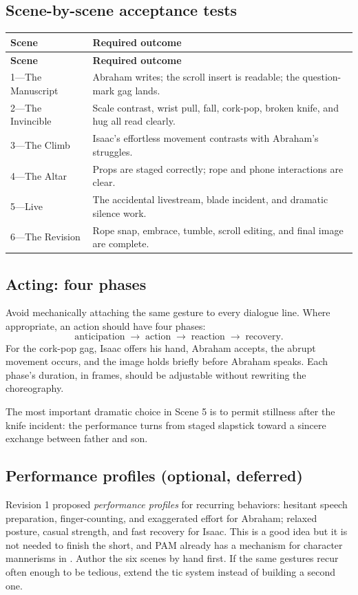 \documentclass[12pt,letterpaper]{article}
\newcommand{\file}[1]{\texttt{\detokenize{#1}}}
\begin{document}
\subsection{Scene-by-scene acceptance tests}
\begin{longtable}{@{}p{}p{}@{}}
\toprule
\textbf{Scene} & \textbf{Required outcome}\\
\midrule
\endfirsthead
\toprule
\textbf{Scene} & \textbf{Required outcome}\\
\midrule
\endhead
1---The Manuscript & Abraham writes; the scroll insert is readable; the question-mark gag lands.\\
2---The Invincible & Scale contrast, wrist pull, fall, cork-pop, broken knife, and hug all read clearly.\\
3---The Climb & Isaac's effortless movement contrasts with Abraham's struggles.\\
4---The Altar & Props are staged correctly; rope and phone interactions are clear.\\
5---Live & The accidental livestream, blade incident, and dramatic silence work.\\
6---The Revision & Rope snap, embrace, tumble, scroll editing, and final image are complete.\\
\bottomrule
\end{longtable}

\subsection{Acting: four phases}
Avoid mechanically attaching the same gesture to every dialogue line. Where appropriate, an action should have four phases:
\[
\text{anticipation}\;\longrightarrow\;
\text{action}\;\longrightarrow\;
\text{reaction}\;\longrightarrow\;
\text{recovery}.
\]
For the cork-pop gag, Isaac offers his hand, Abraham accepts, the abrupt movement occurs, and the image holds briefly before Abraham speaks. Each phase's duration, in frames, should be adjustable without rewriting the choreography.

The most important dramatic choice in Scene 5 is to permit stillness after the knife incident: the performance turns from staged slapstick toward a sincere exchange between father and son.

\subsection{Performance profiles (optional, deferred)}
Revision 1 proposed \emph{performance profiles} for recurring behaviors: hesitant speech preparation, finger-counting, and exaggerated effort for Abraham; relaxed posture, casual strength, and fast recovery for Isaac. This is a good idea but it is not needed to finish the short, and PAM already has a mechanism for character mannerisms in \file{pam/tics.py}. Author the six scenes by hand first. If the same gestures recur often enough to be tedious, extend the tic system instead of building a second one.
\end{document}
